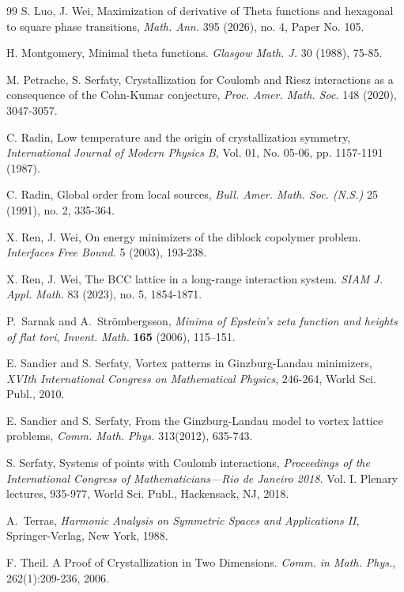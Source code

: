 \documentclass[reqno,english]{amsart}
\theoremstyle{definition}
\newtheorem{open problem}[theorem]{Open Problem}
\theoremstyle{remark}
\theoremstyle{plain}
\numberwithin{equation}{section}
\begin{document}
\begin{thebibliography}{99}
S. Luo, J. Wei,
Maximization of derivative of Theta functions and hexagonal to square phase transitions,
{\em Math. Ann.} 395 (2026), no. 4, Paper No. 105.



H. Montgomery, Minimal theta functions. {\em Glasgow Math. J.} 30 (1988), 75-85.


 M. Petrache, S. Serfaty,
Crystallization for Coulomb and Riesz interactions as a consequence of the Cohn-Kumar conjecture,
{\em Proc. Amer. Math. Soc.} 148 (2020), 3047-3057.

C. Radin, Low temperature and the origin of crystallization symmetry,
{\em International Journal of Modern Physics B}, Vol. 01, No. 05-06, pp. 1157-1191 (1987).

C. Radin, Global order from local sources, {\em Bull. Amer. Math. Soc. (N.S.)} 25 (1991), no. 2, 335-364.

X. Ren, J. Wei, On energy minimizers of the diblock copolymer problem. {\em Interfaces Free
Bound.} 5 (2003), 193-238.


X. Ren, J. Wei, The BCC lattice in a long-range interaction system. {\em SIAM J. Appl. Math.} 83 (2023), no. 5, 1854-1871.



P.~Sarnak and A.~Str\"ombergsson,
\emph{Minima of Epstein's zeta function and heights of flat tori},
{\em Invent. Math.} \textbf{165} (2006), 115--151.



E. Sandier and S. Serfaty, Vortex patterns in Ginzburg-Landau minimizers, {\em XVIth International Congress on Mathematical Physics}, 246-264, World Sci. Publ., 2010.

E. Sandier and S. Serfaty, From the Ginzburg-Landau model to vortex lattice problems, {\em Comm. Math. Phys.} 313(2012), 635-743.


 S. Serfaty, Systems of points with Coulomb interactions, {\em Proceedings of the International Congress of Mathematicians---Rio de Janeiro 2018.} Vol. I. Plenary lectures, 935-977, World Sci. Publ., Hackensack, NJ, 2018.


A.~Terras, \emph{Harmonic Analysis on Symmetric Spaces and Applications II},
Springer-Verlag, New York, 1988.

F. Theil. A Proof of Crystallization in Two Dimensions. {\em Comm. in Math.
Phys.}, 262(1):209-236, 2006.

\end{thebibliography}
\end{document}
